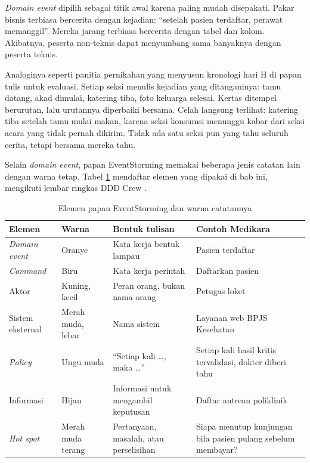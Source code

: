 \textit{Domain event} dipilih sebagai titik awal karena paling mudah disepakati. Pakar bisnis
terbiasa bercerita dengan kejadian: ``setelah pasien terdaftar, perawat memanggil''. Mereka jarang
terbiasa bercerita dengan tabel dan kolom. Akibatnya, peserta non-teknis dapat menyumbang sama
banyaknya dengan peserta teknis.

Analoginya seperti panitia pernikahan yang menyusun kronologi hari H di papan tulis untuk evaluasi.
Setiap seksi menulis kejadian yang ditanganinya: tamu datang, akad dimulai, katering tiba, foto
keluarga selesai. Kertas ditempel berurutan, lalu urutannya diperbaiki bersama. Celah langsung
terlihat: katering tiba setelah tamu mulai makan, karena seksi konsumsi menunggu kabar dari seksi
acara yang tidak pernah dikirim. Tidak ada satu seksi pun yang tahu seluruh cerita, tetapi bersama
mereka tahu.

Selain \textit{domain event}, papan EventStorming memakai beberapa jenis catatan lain dengan warna
tetap. Tabel \ref{tab:ch06-elemen-es} mendaftar elemen yang dipakai di bab ini, mengikuti lembar
ringkas DDD Crew \cite{c06-dddcrew-eventstorming}.

\begin{table}[!htb]
  \centering
  \caption{Elemen papan EventStorming dan warna catatannya}
  \label{tab:ch06-elemen-es}
  \footnotesize
  \begin{tabularx}{\textwidth}{>{\raggedright\arraybackslash}p{2.2cm} >{\raggedright\arraybackslash}p{2.1cm} >{\raggedright\arraybackslash}X >{\raggedright\arraybackslash}X}
    \hline
    \textbf{Elemen} & \textbf{Warna} & \textbf{Bentuk tulisan} & \textbf{Contoh Medikara} \\ \hline
    \textit{Domain event} & Oranye & Kata kerja bentuk lampau & Pasien terdaftar \\ \hline
    \textit{Command} & Biru & Kata kerja perintah & Daftarkan pasien \\ \hline
    Aktor & Kuning, kecil & Peran orang, bukan nama orang & Petugas loket \\ \hline
    Sistem eksternal & Merah muda, lebar & Nama sistem & Layanan web BPJS Kesehatan \\ \hline
    \textit{Policy} & Ungu muda & ``Setiap kali \dots, maka \dots'' & Setiap kali hasil kritis
      tervalidasi, dokter diberi tahu \\ \hline
    Informasi & Hijau & Informasi untuk mengambil keputusan & Daftar antrean poliklinik \\ \hline
    \textit{Hot spot} & Merah muda terang & Pertanyaan, masalah, atau perselisihan & Siapa menutup
      kunjungan bila pasien pulang sebelum membayar? \\ \hline
  \end{tabularx}
\end{table}

